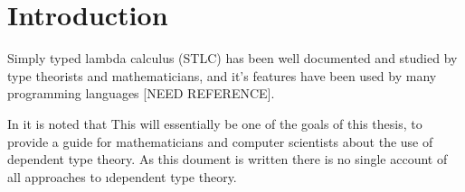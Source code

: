 \section{Introduction}

Simply typed lambda calculus (STLC) has been well documented and studied by type theorists and mathematicians, and it's features have been used by many programming languages [NEED REFERENCE].

In \cite{BarendregtHenk2013Lcwt} it is noted that  This will essentially be one of the goals of this thesis, to provide a guide for mathematicians and computer scientists about the use of dependent type theory. As this doument is written there is no single account of all approaches to \i{dependent} type theory.


